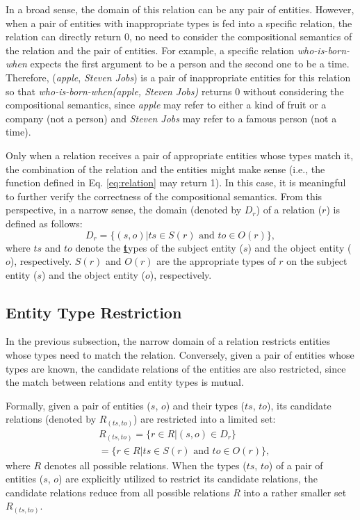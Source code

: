 \documentclass[11pt,a4paper]{article}
\begin{document}
In a broad sense, the domain of this relation can be any pair of entities. 
However, when a pair of entities with inappropriate types is fed into a specific relation, 
the relation can directly return 0, no need to consider the compositional semantics of the relation and the pair of entities.
For example, a specific relation \textit{who-is-born-when} expects the first argument to be a person and the second one to be a time.
Therefore, (\textit{apple}, \textit{Steven Jobs}) is a pair of inappropriate entities for this relation so that 
\textit{who-is-born-when(apple, Steven Jobs)} returns 0 without considering the compositional semantics, 
since \textit{apple} may refer to either a kind of fruit or a company (not a person) and  \textit{Steven Jobs} may refer to a famous person (not a time). 

Only when a relation receives a pair of appropriate entities whose types match it, 
the combination of the relation and the entities might make sense (i.e., the function defined in Eq. \ref{eq:relation} may return 1).
In this case, it is meaningful to further verify the correctness of the  compositional semantics.
From this perspective, in a narrow sense,  the domain (denoted by $D_r$) of a relation ($r$) is defined as follows:
\begin{equation}
	D_r = \{(s,o)|ts \in S(r) \text{ and } to \in O(r)\},
\end{equation}
where  $ts$ and $to$ denote the \textbf{\underline{t}}ypes of the subject entity ($s$) and the object entity ($o$), respectively.
 $S(r)$ and $O(r)$ are the appropriate types of $r$ on the subject entity ($s$) and the object entity ($o$), respectively.

 
\subsection{Entity Type Restriction}
In the previous subsection, the narrow domain of a relation restricts entities whose types need to match the relation.
Conversely, given a pair of entities whose types are known, the candidate relations of the entities are also restricted, 
since the match between relations and entity types is mutual.

Formally, given a pair of entities  ($s$, $o$) and their types ($ts$, $to$), 
its candidate relations (denoted by $R_{(ts,to)}$) are restricted into a limited set:
\begin{equation}
	\label{eq:etr}
	\begin{split}
		&R_{(ts,to)} = \{r \in R | {(s,o) \in D_r}\} \\
		&= \{r \in R | ts \in S(r) \text{ and } to \in O(r)\}, 
	\end{split}
\end{equation}
where $R$ denotes all possible relations. 
When the types ($ts$, $to$) of a pair of entities ($s$, $o$) are explicitly utilized to restrict its candidate relations, 
the candidate relations reduce from all possible relations  $R$ into a rather smaller set $R_{(ts,to)}$.
\end{document}
